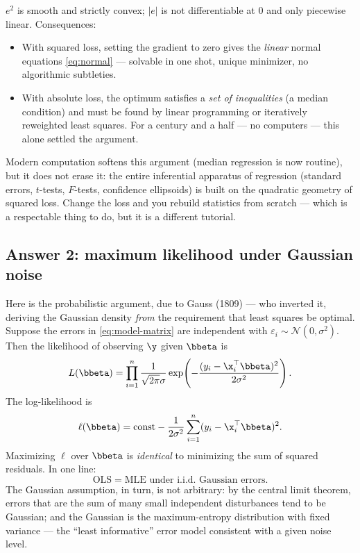 $e^2$ is smooth and strictly convex; $|e|$ is not differentiable at $0$ and only piecewise linear. Consequences:

\begin{itemize}
  \item With squared loss, setting the gradient to zero gives the \emph{linear} normal equations \eqref{eq:normal} — solvable in one shot, unique minimizer, no algorithmic subtleties.
  \item With absolute loss, the optimum satisfies a \emph{set of inequalities} (a median condition) and must be found by linear programming or iteratively reweighted least squares. For a century and a half — no computers — this alone settled the argument.
\end{itemize}

Modern computation softens this argument (median regression is now routine), but it does not erase it: the entire inferential apparatus of regression (standard errors, $t$-tests, $F$-tests, confidence ellipsoids) is built on the quadratic geometry of squared loss. Change the loss and you rebuild statistics from scratch — which is a respectable thing to do, but it is a different tutorial.

\subsection{Answer 2: maximum likelihood under Gaussian noise}\label{sec:why-squared-mle}

Here is the probabilistic argument, due to Gauss (1809) — who inverted it, deriving the Gaussian density \emph{from} the requirement that least squares be optimal. Suppose the errors in \eqref{eq:model-matrix} are independent with $\varepsilon_i \sim \mathcal{N}(0, \sigma^2)$. Then the likelihood of observing $\y$ given $\bbeta$ is
\[
  L(\bbeta) = \prod_{i=1}^n \frac{1}{\sqrt{2\pi}\sigma} \exp\!\left( -\frac{(y_i - \x_i^\top \bbeta)^2}{2\sigma^2} \right).
\]
The log-likelihood is
\[
  \ell(\bbeta) = \text{const} - \frac{1}{2\sigma^2} \sum_{i=1}^n (y_i - \x_i^\top \bbeta)^2.
\]
Maximizing $\ell$ over $\bbeta$ is \emph{identical} to minimizing the sum of squared residuals. In one line:
\[
  \boxed{\;\text{OLS} = \text{MLE under i.i.d.\ Gaussian errors}.\;}
\]
The Gaussian assumption, in turn, is not arbitrary: by the central limit theorem, errors that are the sum of many small independent disturbances tend to be Gaussian; and the Gaussian is the maximum-entropy distribution with fixed variance — the ``least informative'' error model consistent with a given noise level.

